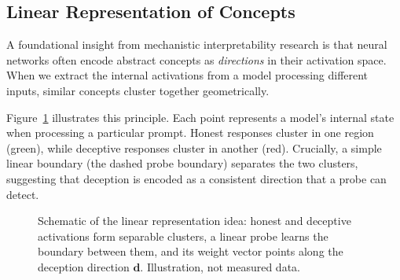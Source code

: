 \documentclass[11pt,letterpaper]{article}
\let\origsubsection\subsection
\renewcommand{\subsection}{\needspace{8\baselineskip}\origsubsection}}
\begin{document}
\subsection{Linear Representation of Concepts}

A foundational insight from mechanistic interpretability research is that neural networks often encode abstract concepts as \textit{directions} in their activation space. When we extract the internal activations from a model processing different inputs, similar concepts cluster together geometrically.

Figure~\ref{fig:linear-rep} illustrates this principle. Each point represents a model's internal state when processing a particular prompt. Honest responses cluster in one region (green), while deceptive responses cluster in another (red). Crucially, a simple linear boundary (the dashed probe boundary) separates the two clusters, suggesting that deception is encoded as a consistent direction that a probe can detect.

\begin{figure}[!htbp]
\centering
{}
\caption{Schematic of the linear representation idea: honest and deceptive activations form separable clusters, a linear probe learns the boundary between them, and its weight vector points along the deception direction $\mathbf{d}$. Illustration, not measured data.}
\label{fig:linear-rep}
\end{figure}
\end{document}

